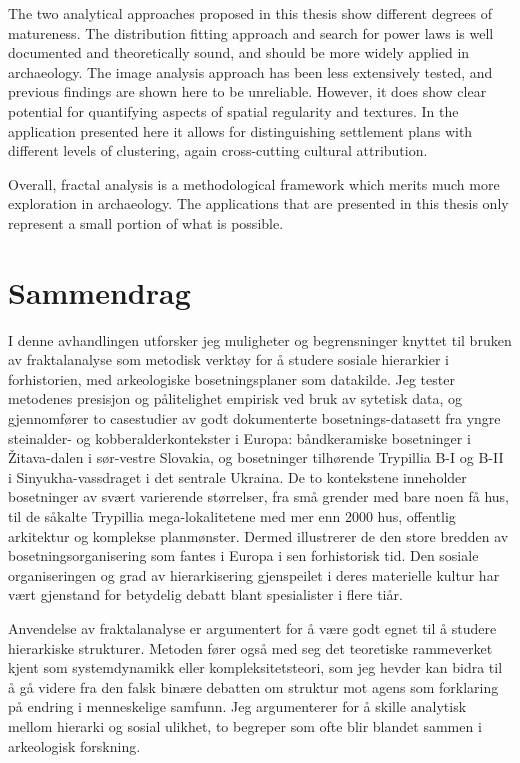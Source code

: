 \documentclass[
  12pt,
  a4paper, twoside]{book}
\begin{document}
The two analytical approaches proposed in this thesis show different degrees of matureness. The distribution fitting approach and search for power laws is well documented and theoretically sound, and should be more widely applied in archaeology. The image analysis approach has been less extensively tested, and previous findings are shown here to be unreliable. However, it does show clear potential for quantifying aspects of spatial regularity and textures. In the application presented here it allows for distinguishing settlement plans with different levels of clustering, again cross-cutting cultural attribution.

Overall, fractal analysis is a methodological framework which merits much more exploration in archaeology. The applications that are presented in this thesis only represent a small portion of what is possible.

\hypertarget{sammendrag}{%
\section*{Sammendrag}\label{sammendrag}}

I denne avhandlingen utforsker jeg muligheter og begrensninger knyttet til bruken av fraktalanalyse som metodisk verktøy for å studere sosiale hierarkier i forhistorien, med arkeologiske bosetningsplaner som datakilde. Jeg tester metodenes presisjon og pålitelighet empirisk ved bruk av sytetisk data, og gjennomfører to casestudier av godt dokumenterte bosetnings-datasett fra yngre steinalder- og kobberalderkontekster i Europa: båndkeramiske bosetninger i Žitava-dalen i sør-vestre Slovakia, og bosetninger tilhørende Trypillia B-I og B-II i Sinyukha-vassdraget i det sentrale Ukraina. De to kontekstene inneholder bosetninger av svært varierende størrelser, fra små grender med bare noen få hus, til de såkalte Trypillia mega-lokalitetene med mer enn 2000 hus, offentlig arkitektur og komplekse planmønster. Dermed illustrerer de den store bredden av bosetningsorganisering som fantes i Europa i sen forhistorisk tid. Den sosiale organiseringen og grad av hierarkisering gjenspeilet i deres materielle kultur har vært gjenstand for betydelig debatt blant spesialister i flere tiår.

Anvendelse av fraktalanalyse er argumentert for å være godt egnet til å studere hierarkiske strukturer. Metoden fører også med seg det teoretiske rammeverket kjent som systemdynamikk eller kompleksitetsteori, som jeg hevder kan bidra til å gå videre fra den falsk binære debatten om struktur mot agens som forklaring på endring i menneskelige samfunn. Jeg argumenterer for å skille analytisk mellom hierarki og sosial ulikhet, to begreper som ofte blir blandet sammen i arkeologisk forskning.
\end{document}
